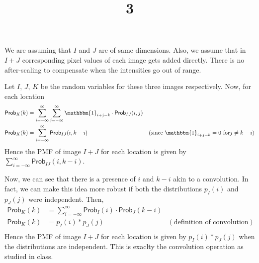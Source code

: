 \documentclass[a4paper]{article}
\title{3}
\date{}
\renewcommand{\P}{\textsf{Prob}}
\begin{document}
\maketitle
We are assuming that $I$ and $J$ are of same dimensions. Also, we assume that in $I+J$ corresponding pixel values of each image gets added directly. There is no after-scaling to compensate when the intensities go out of range.

Let $I$, $J$, $K$ be the random variables for these three images respectively. Now, for each location
\begin{equation}
	\begin{aligned}
		\P_K(k) &= \sum_{i=-\infty}^{\infty}\sum_{j=-\infty}^{\infty} \mathbbm{1}_{i+j=k} \cdot \P_{IJ}(i,j) &\\
		\P_K(k) &= \sum_{i=-\infty}^{\infty} \P_{IJ}(i,k-i) &(\text{since } \mathbbm{1}_{i+j=k} = 0 \text{ for} j\neq k-i)
	\end{aligned}
\end{equation}
Hence the PMF of image $I+J$ for each location is given by $\displaystyle\sum_{i=-\infty}^{\infty} \P_{IJ}(i,k-i)$.

Now, we can see that there is a presence of $i$ and $k-i$ akin to a convolution. In fact, we can make this idea more robust if both the distributions $p_I(i)$ and $p_J(j)$ were independent. Then, 
\begin{equation}
	\begin{aligned}
		\P_K(k) &= \sum_{i=-\infty}^{\infty} \P_{I}(i) \cdot \P_{J}(k-i) &\\
		\P_K(k) &= p_I(i) \ast p_J(j) &(\text{definition of convolution})\\
	\end{aligned}
\end{equation}
Hence the PMF of image $I+J$ for each location is given by $p_I(i) \ast p_J(j)$ when the distributions are independent. This is exaclty the convolution operation as studied in class.
\end{document}
